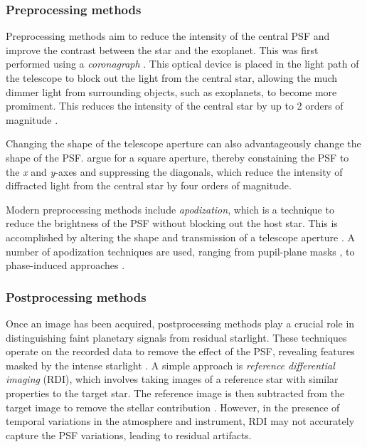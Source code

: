 \documentclass[preprint,longauthor]{aastex631}
\numberwithin{equation}{section}
\begin{document}
\subsubsection{Preprocessing methods}

Preprocessing methods aim to reduce the intensity of the central PSF and improve the contrast between the star and the exoplanet. This was first performed using a \textit{coronagraph} \citep{lyotStudySolarCorona1939}. This optical device is placed in the light path of the telescope to block out the light from the central star, allowing the much dimmer light from surrounding objects, such as exoplanets, to become more promiment. This reduces the intensity of the central star by up to 2 orders of magnitude \citep{chauvinDirectImagingExoplanets2023}.

Changing the shape of the telescope aperture can also advantageously change the shape of the PSF. \citet{zanoniReductionDiffractedLight1965} argue for a square aperture, thereby constaining the PSF to the \textit{x} and \textit{y}-axes and suppressing the diagonals, which reduce the intensity of diffracted light from the central star by four orders of magnitude.

Modern preprocessing methods include \textit{apodization}, which is a technique to reduce the brightness of the PSF without blocking out the host star. This is accomplished by altering the shape and transmission of a telescope aperture \citep{nisensonDetectionEarthlikePlanets2001}. A number of apodization techniques are used, ranging from pupil-plane masks \citep{reddyApodizationPupilsDesign2018}, to phase-induced approaches \citep{guyonExoplanetImagingPhaseinduced2005}.

\subsubsection{Postprocessing methods}

Once an image has been acquired, postprocessing methods play a crucial role in distinguishing faint planetary signals from residual starlight. These techniques operate on the recorded data to remove the effect of the PSF, revealing features masked by the intense starlight \citep{lafreniereNewAlgorithmPoint2007}. A simple approach is \textit{reference differential imaging} (RDI), which involves taking images of a reference star with similar properties to the target star. The reference image is then subtracted from the target image to remove the stellar contribution \citep{folletteIntroductionHighContrast2023}. However, in the presence of temporal variations in the atmosphere and instrument, RDI may not accurately capture the PSF variations, leading to residual artifacts.
\end{document}
